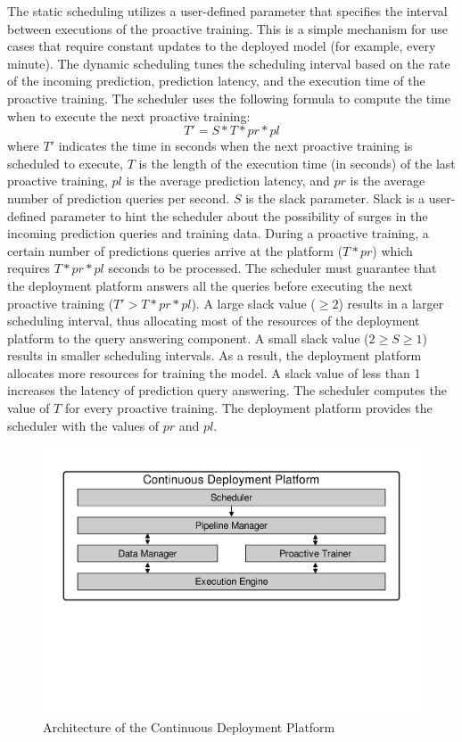 The static scheduling utilizes a user-defined parameter that specifies the interval between executions of the proactive training.
This is a simple mechanism for use cases that require constant updates to the deployed model (for example, every minute).
The dynamic scheduling tunes the scheduling interval based on the rate of the incoming prediction, prediction latency, and the execution time of the proactive training.
The scheduler uses the following formula to compute the time when to execute the next proactive training:
\begin{equation}
T' = S * T * pr * pl
\end{equation}
where $T'$ indicates the time in seconds when the next proactive training is scheduled to execute, $T$ is the length of the execution time (in seconds) of the last proactive training, $pl$ is the average prediction latency, and $pr$ is the average number of prediction queries per second.
$S$ is the slack parameter.
Slack is a user-defined parameter to hint the scheduler about the possibility of surges in the incoming prediction queries and training data.
During a proactive training, a certain number of predictions queries arrive at the platform ($T * pr$) which requires $T * pr * pl$ seconds to be processed.
The scheduler must guarantee that the deployment platform answers all the queries before executing the next proactive training ($T' > T * pr * pl$).
A large slack value ($\geq2$) results in a larger scheduling interval, thus allocating most of the resources of the deployment platform to the query answering component.
A small slack value ($2 \geq S \geq 1$) results in smaller scheduling intervals.
As a result, the deployment platform allocates more resources for training the model.
A slack value of less than 1 increases the latency of prediction query answering.
The scheduler computes the value of $T$ for every proactive training.
The deployment platform provides the scheduler with the values of $pr$ and $pl$. 

\begin{figure}[h]
\centering
\includegraphics[width=\columnwidth]{../images/system-architecture.pdf}
\caption{Architecture of the Continuous Deployment Platform}
 \vspace{-30pt}
\label{fig:system-architecture}
\end{figure}


